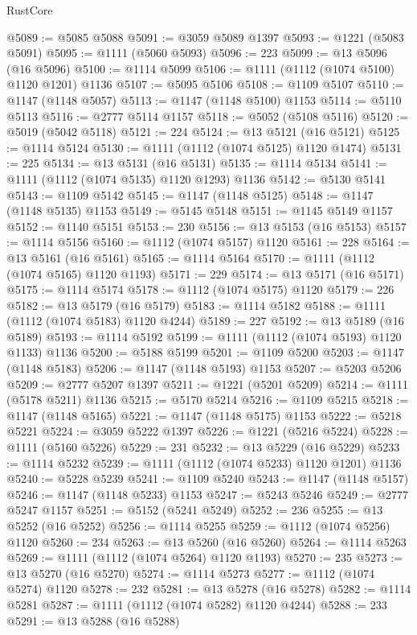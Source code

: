 \begin{lexlean}{RustCore}
\begin{coremodule}
@5089 := @5085 @5088
@5091 := @3059 @5089 @1397
@5093 := @1221 (@5083 @5091)
@5095 := @1111 (@5060 @5093)
@5096 := 223
@5099 := @13 @5096 (@16 @5096)
@5100 := @1114 @5099
@5106 := @1111 (@1112 (@1074 @5100) @1120 @1201) @1136
@5107 := @5095 @5106
@5108 := @1109 @5107
@5110 := @1147 (@1148 @5057)
@5113 := @1147 (@1148 @5100) @1153
@5114 := @5110 @5113
@5116 := @2777 @5114 @1157
@5118 := @5052 (@5108 @5116)
@5120 := @5019 (@5042 @5118)
@5121 := 224
@5124 := @13 @5121 (@16 @5121)
@5125 := @1114 @5124
@5130 := @1111 (@1112 (@1074 @5125) @1120 @1474)
@5131 := 225
@5134 := @13 @5131 (@16 @5131)
@5135 := @1114 @5134
@5141 := @1111 (@1112 (@1074 @5135) @1120 @1293) @1136
@5142 := @5130 @5141
@5143 := @1109 @5142
@5145 := @1147 (@1148 @5125)
@5148 := @1147 (@1148 @5135) @1153
@5149 := @5145 @5148
@5151 := @1145 @5149 @1157
@5152 := @1140 @5151
@5153 := 230
@5156 := @13 @5153 (@16 @5153)
@5157 := @1114 @5156
@5160 := @1112 (@1074 @5157) @1120
@5161 := 228
@5164 := @13 @5161 (@16 @5161)
@5165 := @1114 @5164
@5170 := @1111 (@1112 (@1074 @5165) @1120 @1193)
@5171 := 229
@5174 := @13 @5171 (@16 @5171)
@5175 := @1114 @5174
@5178 := @1112 (@1074 @5175) @1120
@5179 := 226
@5182 := @13 @5179 (@16 @5179)
@5183 := @1114 @5182
@5188 := @1111 (@1112 (@1074 @5183) @1120 @4244)
@5189 := 227
@5192 := @13 @5189 (@16 @5189)
@5193 := @1114 @5192
@5199 := @1111 (@1112 (@1074 @5193) @1120 @1133) @1136
@5200 := @5188 @5199
@5201 := @1109 @5200
@5203 := @1147 (@1148 @5183)
@5206 := @1147 (@1148 @5193) @1153
@5207 := @5203 @5206
@5209 := @2777 @5207 @1397
@5211 := @1221 (@5201 @5209)
@5214 := @1111 (@5178 @5211) @1136
@5215 := @5170 @5214
@5216 := @1109 @5215
@5218 := @1147 (@1148 @5165)
@5221 := @1147 (@1148 @5175) @1153
@5222 := @5218 @5221
@5224 := @3059 @5222 @1397
@5226 := @1221 (@5216 @5224)
@5228 := @1111 (@5160 @5226)
@5229 := 231
@5232 := @13 @5229 (@16 @5229)
@5233 := @1114 @5232
@5239 := @1111 (@1112 (@1074 @5233) @1120 @1201) @1136
@5240 := @5228 @5239
@5241 := @1109 @5240
@5243 := @1147 (@1148 @5157)
@5246 := @1147 (@1148 @5233) @1153
@5247 := @5243 @5246
@5249 := @2777 @5247 @1157
@5251 := @5152 (@5241 @5249)
@5252 := 236
@5255 := @13 @5252 (@16 @5252)
@5256 := @1114 @5255
@5259 := @1112 (@1074 @5256) @1120
@5260 := 234
@5263 := @13 @5260 (@16 @5260)
@5264 := @1114 @5263
@5269 := @1111 (@1112 (@1074 @5264) @1120 @1193)
@5270 := 235
@5273 := @13 @5270 (@16 @5270)
@5274 := @1114 @5273
@5277 := @1112 (@1074 @5274) @1120
@5278 := 232
@5281 := @13 @5278 (@16 @5278)
@5282 := @1114 @5281
@5287 := @1111 (@1112 (@1074 @5282) @1120 @4244)
@5288 := 233
@5291 := @13 @5288 (@16 @5288)

\end{coremodule}
\end{lexlean}
